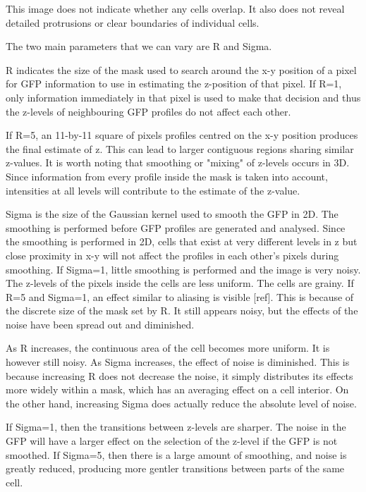 This image does not indicate whether any cells overlap. It also does not reveal detailed protrusions or clear boundaries of individual cells.


The two main parameters that we can vary are R and Sigma.

R indicates the size of the mask used to search around the x-y position of a pixel for GFP information to use in estimating the z-position of that pixel. If R=1, only information immediately in that pixel is used to make that decision and thus the z-levels of neighbouring GFP profiles do not affect each other.

If R=5, an 11-by-11 square of pixels profiles centred on the x-y position produces the final estimate of z. This can lead to larger contiguous regions sharing similar z-values. It is worth noting that smoothing or "mixing" of z-levels occurs in 3D. Since information from every profile inside the mask is taken into account, intensities at all levels will contribute to the estimate of the z-value.

Sigma is the size of the Gaussian kernel used to smooth the GFP in 2D. The smoothing is performed before GFP profiles are generated and analysed. Since the smoothing is performed in 2D, cells that exist at very different levels in z but close proximity in x-y will not affect the profiles in each other's pixels during smoothing. If Sigma=1, little smoothing is performed and the image is very noisy. The z-levels of the pixels inside the cells are less uniform. The cells are grainy. If R=5 and Sigma=1, an effect similar to aliasing is visible [ref]. This is because of the discrete size of the mask set by R. It still appears noisy, but the effects of the noise have been spread out and diminished.

As R increases, the continuous area of the cell becomes more uniform. It is however still noisy. As Sigma increases, the effect of noise is diminished. This is because increasing R does not decrease the noise, it simply distributes its effects more widely within a mask, which has an averaging effect on a cell interior. On the other hand, increasing Sigma does actually reduce the absolute level of noise.

If Sigma=1, then the transitions between z-levels are sharper. The noise in the GFP will have a larger effect on the selection of the z-level if the GFP is not smoothed. If Sigma=5, then there is a large amount of smoothing, and noise is greatly reduced, producing more gentler transitions between parts of the same cell.

